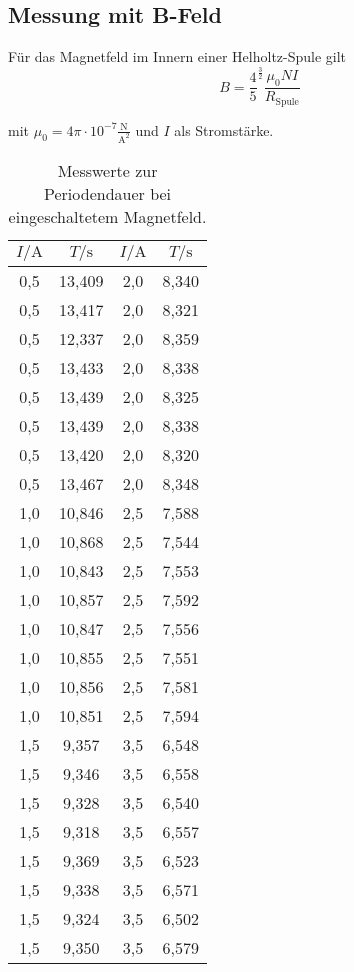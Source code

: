\subsection{Messung mit B-Feld}

Für das Magnetfeld im Innern einer Helholtz-Spule gilt
\begin{equation}
  B=\frac{4}{5}^{\frac{3}{2}} \frac{\mu_0 N I}{R_\mathrm{Spule}}
\end{equation}

mit $\mu_0=4\pi \cdot 10^{-7} \frac{\si{\newton}}{\si{\ampere}^2}$ und $I$ als Stromstärke.

\begin{table}
  \caption{Messwerte zur Periodendauer bei eingeschaltetem Magnetfeld.}
  \centering
  \label{tab:mag}
  \begin{tabular}{c c | cc}
    \toprule
    $I/ \si{\ampere}$ & $T / \si{\second}$ & $I/ \si{\ampere}$ & $T / \si{\second}$ \\
    \midrule
    0,5 & 13,409 &	2,0 & 8,340 \\
    0,5 & 13,417 &	2,0 & 8,321 \\
    0,5 & 12,337 &	2,0 & 8,359 \\
    0,5 & 13,433 &	2,0 & 8,338 \\
    0,5 & 13,439 &	2,0 & 8,325 \\
    0,5 & 13,439 &	2,0 & 8,338 \\
    0,5 & 13,420 &	2,0 & 8,320 \\
    0,5 & 13,467 &	2,0 & 8,348 \\
    1,0 & 10,846 &	2,5 & 7,588 \\
    1,0 & 10,868 &	2,5 & 7,544 \\
    1,0 & 10,843 &	2,5 & 7,553 \\
    1,0 & 10,857 &	2,5 & 7,592 \\
    1,0 & 10,847 &	2,5 & 7,556 \\
    1,0 & 10,855 &	2,5 & 7,551 \\
    1,0 & 10,856 &	2,5 & 7,581 \\
    1,0 & 10,851 &	2,5 & 7,594 \\
    1,5 & 9,357 &	3,5 & 6,548 \\
    1,5 & 9,346 &	3,5 & 6,558 \\
    1,5 & 9,328 &	3,5 & 6,540 \\
    1,5 & 9,318 &	3,5 & 6,557 \\
    1,5 & 9,369 &	3,5 & 6,523 \\
    1,5 & 9,338 &	3,5 & 6,571 \\
    1,5 & 9,324 &	3,5 & 6,502 \\
    1,5 & 9,350 &	3,5 & 6,579 \\

\bottomrule
\end{tabular}
\end{table}

